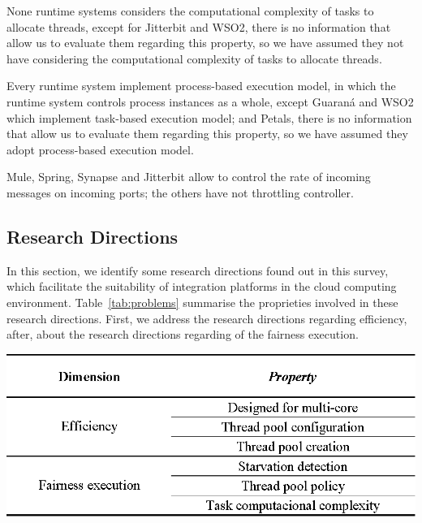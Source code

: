 None runtime systems considers the computational complexity of tasks to allocate threads, except for Jitterbit and WSO2, there is no information that allow us to evaluate them regarding this property, so we have assumed they not have considering the computational complexity of tasks to allocate threads.

Every runtime system implement process-based execution model, in which the runtime system controls process instances as a whole, except Guaraná and WSO2 which implement task-based execution model; and Petals, there is no information that allow us to evaluate them regarding this property, so we have assumed they adopt process-based execution model. 

Mule, Spring, Synapse and Jitterbit allow to control the rate of incoming messages on incoming ports; the others have not throttling controller.

\subsection{{Research Directions}}
\label{subsec:problems}

\noindent

In this section, we identify some research directions found out in this survey,  which facilitate the suitability of integration platforms in the cloud computing environment. Table~\ref{tab:problems} summarise the proprieties involved in these research directions. First, we  address the research directions regarding efficiency, after, about the research directions regarding of the fairness execution.

\begin{table}[hbtp]
	\centering
	\includegraphics[scale=0.9]{./figs/issues.eps}
\label{tab:problems}%
\end{table}%
